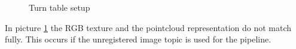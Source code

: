 \documentclass[main.tex]{subfiles}
\begin{document}
        \begin{figure}[H]
                \centering
                \caption{Turn table setup}
              \label{turnTableOriginal}
          \end{figure}
In picture \ref{turnTableOriginal} the RGB texture and the pointcloud representation do not match fully. This occurs if the unregistered image topic is used for the pipeline. 
\end{document}
